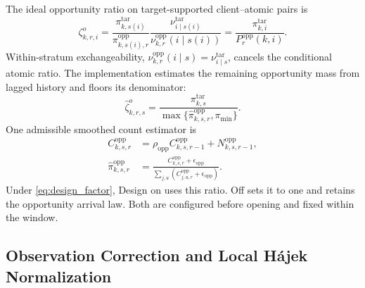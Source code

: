 \documentclass[letterpaper,journal]{IEEEtran}
\begin{document}
The ideal opportunity ratio on target-supported client--atomic pairs is
\begin{equation}
 \zeta^{o}_{k,r,i}
 =
 \frac{\pi^{\mathrm{tar}}_{k,s(i)}}
      {\pi^{\mathrm{opp}}_{k,s(i),r}}
 \frac{\nu^{\mathrm{tar}}_{i\mid s(i)}}
      {\nu^{\mathrm{opp}}_{k,r}(i\mid s(i))}
 =
 \frac{\pi^{\mathrm{tar}}_{k,i}}
      {P_r^{\mathrm{opp}}(k,i)}.
 \label{eq:design_ratio_general}
\end{equation}
Within-stratum exchangeability,
$\nu^{\mathrm{opp}}_{k,r}(i\mid s)=\nu^{\mathrm{tar}}_{i\mid s}$,
cancels the conditional atomic ratio.  The implementation estimates the
remaining opportunity mass from lagged history and floors its denominator:
\begin{equation}
 \widehat\zeta^{o}_{k,r,s}
 =
 \frac{\pi^{\mathrm{tar}}_{k,s}}
 {\max\{\widehat\pi^{\mathrm{opp}}_{k,s,r},\pi_{\min}\}}.
 \label{eq:design_ratio_simple}
\end{equation}
One admissible smoothed count estimator is
\begin{align*}
 C^{\mathrm{opp}}_{k,s,r}
 &=
 \rho_{\mathrm{opp}}C^{\mathrm{opp}}_{k,s,r-1}
 +N^{\mathrm{opp}}_{k,s,r-1},\\
 \widehat\pi^{\mathrm{opp}}_{k,s,r}
 &=
 \frac{C^{\mathrm{opp}}_{k,s,r}+\epsilon_{\mathrm{opp}}}
 {\sum_{j,u}
 (C^{\mathrm{opp}}_{j,u,r}+\epsilon_{\mathrm{opp}})}.
\end{align*}
Under \eqref{eq:design_factor}, Design on uses this ratio.  Off sets it to one
and retains the opportunity arrival law.  Both are configured before opening
and fixed within the window.

\subsection{Observation Correction and Local H\'ajek Normalization}
\label{subsec:observation_hajek}
\end{document}
